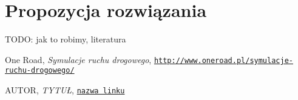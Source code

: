 \documentclass[a4paper,12pt]{article}
\begin{document}
	
	\section{Propozycja rozwiązania}
	TODO: jak to robimy, literatura
	
	\pagebreak
	\begin{thebibliography}{15}
		One Road, \textit{Symulacje ruchu drogowego},
		\texttt{\href{http://www.oneroad.pl/symulacje-ruchu-drogowego/}{http://www.oneroad.pl/symulacje-ruchu-drogowego/}}
		
		AUTOR, \textit{TYTUŁ},
		\texttt{\href{LINK}{nazwa linku}}
		
	\end{thebibliography}
	
\end{document}
